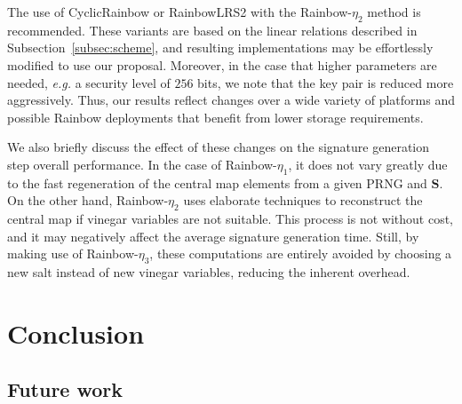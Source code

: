 \documentclass[draft, 12pt, a4paper, oneside]{memoir}
\theoremstyle{definition}
\begin{document}
The use of CyclicRainbow or RainbowLRS2 with the Rainbow-$\eta_{2}$ method is
recommended. These variants are based on the linear relations described in
Subsection~\ref{subsec:scheme}, and resulting implementations may be
effortlessly modified to use our proposal. Moreover, in the case that higher
parameters are needed, \emph{e.g.} a security level of $256$ bits, we note that
the key pair is reduced more aggressively. Thus, our results reflect
changes over a wide variety of platforms and possible Rainbow deployments that
benefit from lower storage requirements.

We also briefly discuss the effect of these changes on the signature generation
step overall performance. In the case of Rainbow-$\eta_{1}$, it does not vary
greatly due to the fast regeneration of the central map elements from a given
PRNG and $\mathbf{S}$. On the other hand, Rainbow-$\eta_{2}$ uses elaborate
techniques to reconstruct the central map if vinegar variables are not
suitable.  This process is not without cost, and it may negatively affect the
average signature generation time. Still, by making use of Rainbow-$\eta_{3}$,
these computations are entirely avoided by choosing a new salt instead of new
vinegar variables, reducing the inherent overhead.

\chapter{Conclusion}

\section{Future work}



\end{document}
